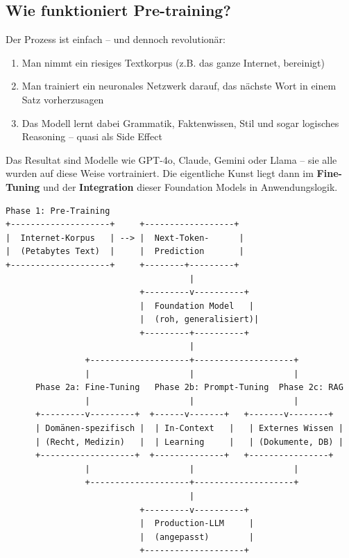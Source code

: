 \subsection*{Wie funktioniert Pre-training?}

Der Prozess ist einfach -- und dennoch revolutionär:

\begin{enumerate}[leftmargin=*]
    \item Man nimmt ein riesiges Textkorpus (z.B. das ganze Internet, bereinigt)
    \item Man trainiert ein neuronales Netzwerk darauf, das nächste Wort in einem Satz vorherzusagen
    \item Das Modell lernt dabei Grammatik, Faktenwissen, Stil und sogar logisches Reasoning -- quasi als Side Effect
\end{enumerate}

Das Resultat sind Modelle wie GPT-4o, Claude, Gemini oder Llama -- sie alle wurden auf diese Weise vortrainiert. Die eigentliche Kunst liegt dann im \textbf{Fine-Tuning} und der \textbf{Integration} dieser Foundation Models in Anwendungslogik.

\begin{verbatim}
Phase 1: Pre-Training
+--------------------+     +------------------+
|  Internet-Korpus   | --> |  Next-Token-      |
|  (Petabytes Text)  |     |  Prediction       |
+--------------------+     +--------+---------+
                                     |
                           +---------v----------+
                           |  Foundation Model   |
                           |  (roh, generalisiert)|
                           +---------+----------+
                                     |
                +--------------------+--------------------+
                |                    |                    |
      Phase 2a: Fine-Tuning   Phase 2b: Prompt-Tuning  Phase 2c: RAG
                |                    |                    |
      +---------v---------+  +------v-------+   +-------v--------+
      | Domänen-spezifisch |  | In-Context   |   | Externes Wissen |
      | (Recht, Medizin)   |  | Learning     |   | (Dokumente, DB) |
      +-------------------+  +--------------+   +----------------+
                |                    |                    |
                +--------------------+--------------------+
                                     |
                           +---------v----------+
                           |  Production-LLM     |
                           |  (angepasst)        |
                           +--------------------+
\end{verbatim}

